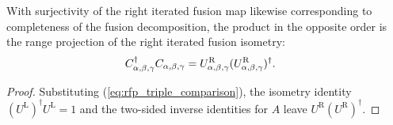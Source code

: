\begin{lemma}%
    \label{lem:mpdo_triple_fusion_comparison_right_range}
    \leanok
    With surjectivity of the right iterated fusion map likewise corresponding
    to completeness of the fusion decomposition, the product in the opposite
    order is the range projection of the right iterated fusion isometry:
    \begin{align}
        C_{\alpha,\beta,\gamma}^{\dagger}C_{\alpha,\beta,\gamma}
         & =U^{\mathrm R}_{\alpha,\beta,\gamma}
        (U^{\mathrm R}_{\alpha,\beta,\gamma})^{\dagger}.
        \notag
    \end{align}
\end{lemma}
\begin{proof}\leanok
    Substituting (\ref{eq:rfp_triple_comparison}), the isometry identity
    $(U^{\mathrm L})^\dagger U^{\mathrm L}=1$ and the two-sided inverse
    identities for $A$ leave
    $U^{\mathrm R}(U^{\mathrm R})^\dagger$.
\end{proof}

